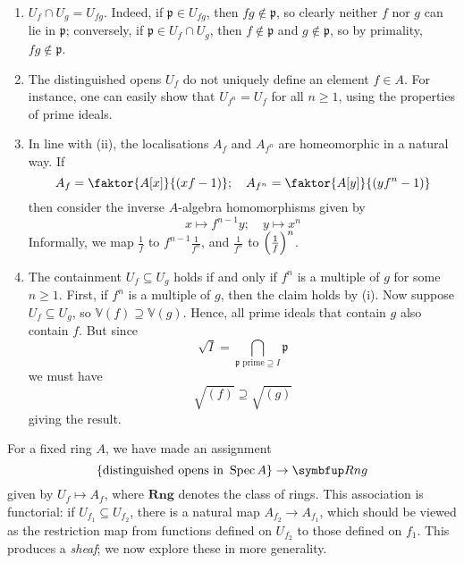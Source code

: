 \begin{remark}
    \begin{enumerate}
        \item \( U_f \cap U_g = U_{fg} \).
        Indeed, if \( \mathfrak p \in U_{fg} \), then \( fg \notin \mathfrak p \), so clearly neither \( f \) nor \( g \) can lie in \( \mathfrak p \); conversely, if \( \mathfrak p \in U_f \cap U_g \), then \( f \notin \mathfrak p \) and \( g \notin \mathfrak p \), so by primality, \( fg \notin \mathfrak p \).
        \item The distinguished opens \( U_f \) do not uniquely define an element \( f \in A \).
        For instance, one can easily show that \( U_{f^n} = U_f \) for all \( n \geq 1 \), using the properties of prime ideals.
        \item In line with (ii), the localisations \( A_f \) and \( A_{f^n} \) are homeomorphic in a natural way.
        If
        \[ A_f = \faktor{A[x]}{(xf - 1)};\quad A_{f^n} = \faktor{A[y]}{(yf^n - 1)} \]
        then consider the inverse \( A \)-algebra homomorphisms given by
        \[ x \mapsto f^{n-1} y;\quad y \mapsto x^n \]
        Informally, we map \( \frac{1}{f} \) to \( f^{n-1} \frac{1}{f^n} \), and \( \frac{1}{f^n} \) to \( \qty(\frac{1}{f})^n \).
        \item The containment \( U_f \subseteq U_g \) holds if and only if \( f^n \) is a multiple of \( g \) for some \( n \geq 1 \).
        First, if \( f^n \) is a multiple of \( g \), then the claim holds by (i).
        Now suppose \( U_f \subseteq U_g \), so \( \mathbb V(f) \supseteq \mathbb V(g) \).
        Hence, all prime ideals that contain \( g \) also contain \( f \).
        But since
        \[ \sqrt{I} = \bigcap_{\mathfrak p \text{ prime} \supseteq I} \mathfrak p \]
        we must have
        \[ \sqrt{(f)} \supseteq \sqrt{(g)} \]
        giving the result.
    \end{enumerate}
\end{remark}
\begin{remark}
    For a fixed ring \( A \), we have made an assignment
    \[ \qty{\text{distinguished opens in } \Spec A} \to \mathbf{Rng} \]
    given by \( U_f \mapsto A_f \), where \( \mathbf{Rng} \) denotes the class of rings.
    This association is functorial: if \( U_{f_1} \subseteq U_{f_2} \), there is a natural map \( A_{f_2} \to A_{f_1} \), which should be viewed as the restriction map from functions defined on \( U_{f_2} \) to those defined on \( f_1 \).
    This produces a \emph{sheaf}; we now explore these in more generality.
\end{remark}

